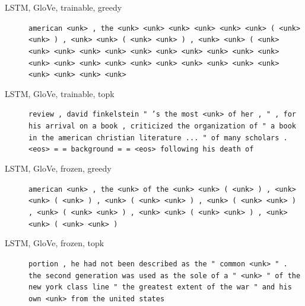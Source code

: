 \begin{description}
\item[LSTM, GloVe, trainable, greedy] \texttt{\small american \textless{}unk\textgreater{} , the \textless{}unk\textgreater{} \textless{}unk\textgreater{} \textless{}unk\textgreater{} \textless{}unk\textgreater{} \textless{}unk\textgreater{} \textless{}unk\textgreater{} ( \textless{}unk\textgreater{} \textless{}unk\textgreater{} ) , \textless{}unk\textgreater{} \textless{}unk\textgreater{} ( \textless{}unk\textgreater{} \textless{}unk\textgreater{} ) , \textless{}unk\textgreater{} \textless{}unk\textgreater{} ( \textless{}unk\textgreater{} \textless{}unk\textgreater{} \textless{}unk\textgreater{} \textless{}unk\textgreater{} \textless{}unk\textgreater{} \textless{}unk\textgreater{} \textless{}unk\textgreater{} \textless{}unk\textgreater{} \textless{}unk\textgreater{} \textless{}unk\textgreater{} \textless{}unk\textgreater{} \textless{}unk\textgreater{} \textless{}unk\textgreater{} \textless{}unk\textgreater{} \textless{}unk\textgreater{} \textless{}unk\textgreater{} \textless{}unk\textgreater{} \textless{}unk\textgreater{} \textless{}unk\textgreater{} \textless{}unk\textgreater{} \textless{}unk\textgreater{} \textless{}unk\textgreater{} \textless{}unk\textgreater{} \textless{}unk\textgreater{} \textless{}unk\textgreater{}}
\item[LSTM, GloVe, trainable, topk] \texttt{\small review , david finkelstein " 's the most \textless{}unk\textgreater{} of her , " , for his arrival on a book , criticized the organization of " a book in the american christian literature ... " of many scholars . \textless{}eos\textgreater{} = = background = = \textless{}eos\textgreater{} following his death of}
\item[LSTM, GloVe, frozen, greedy] \texttt{\small american \textless{}unk\textgreater{} , the \textless{}unk\textgreater{} of the \textless{}unk\textgreater{} \textless{}unk\textgreater{} ( \textless{}unk\textgreater{} ) , \textless{}unk\textgreater{} \textless{}unk\textgreater{} ( \textless{}unk\textgreater{} ) , \textless{}unk\textgreater{} ( \textless{}unk\textgreater{} \textless{}unk\textgreater{} ) , \textless{}unk\textgreater{} ( \textless{}unk\textgreater{} \textless{}unk\textgreater{} ) , \textless{}unk\textgreater{} ( \textless{}unk\textgreater{} \textless{}unk\textgreater{} ) , \textless{}unk\textgreater{} \textless{}unk\textgreater{} ( \textless{}unk\textgreater{} \textless{}unk\textgreater{} ) , \textless{}unk\textgreater{} \textless{}unk\textgreater{} ( \textless{}unk\textgreater{} \textless{}unk\textgreater{} )}
\item[LSTM, GloVe, frozen, topk] \texttt{\small portion , he had not been described as the " common \textless{}unk\textgreater{} " . the second generation was used as the sole of a " \textless{}unk\textgreater{} " of the new york class line \textemdash{} " the greatest extent of the war " and his own \textless{}unk\textgreater{} from the united states}
\end{description}